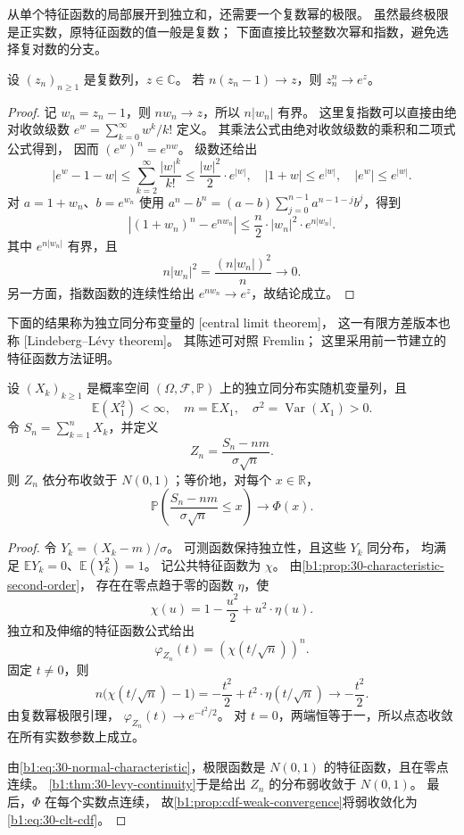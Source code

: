 从单个特征函数的局部展开到独立和，还需要一个复数幂的极限。
虽然最终极限是正实数，原特征函数的值一般是复数；
下面直接比较整数次幂和指数，避免选择复对数的分支。

\begin{lemma}\label{b1:lem:30-complex-power-limit}
设 \((z_n)_{n\geq1}\) 是复数列，\(z\in\mathbb C\)。
若 \(n(z_n-1)\to z\)，则 \(z_n^n\to e^z\)。
\end{lemma}
\begin{proof}
记 \(w_n=z_n-1\)，则 \(n w_n\to z\)，所以 \(n|w_n|\) 有界。
这里复指数可以直接由绝对收敛级数
\(e^w=\sum_{k=0}^\infty w^k/k!\) 定义。
其乘法公式由绝对收敛级数的乘积和二项式公式得到，
因而 \((e^w)^n=e^{nw}\)。
级数还给出
\[
 |e^w-1-w|
 \leq\sum_{k=2}^\infty\frac{|w|^k}{k!}
 \leq\frac{|w|^2}{2}\cdot e^{|w|},
 \quad
 |1+w|\leq e^{|w|},\quad |e^w|\leq e^{|w|}.
\]
对 \(a=1+w_n\)、\(b=e^{w_n}\) 使用
\(a^n-b^n=(a-b)\sum_{j=0}^{n-1}a^{n-1-j}b^j\)，得到
\[
 |(1+w_n)^n-e^{n w_n}|
 \leq\frac n2\cdot|w_n|^2\cdot e^{n|w_n|}.
\]
其中 \(e^{n|w_n|}\) 有界，且
\[
 n|w_n|^2=\frac{(n|w_n|)^2}{n}\longrightarrow0.
\]
另一方面，指数函数的连续性给出 \(e^{n w_n}\to e^z\)，故结论成立。
\end{proof}

下面的结果称为独立同分布变量的
[central limit theorem]，
这一有限方差版本也称
[Lindeberg--Lévy theorem]。
其陈述可对照 Fremlin\cite[274I]{Fremlin2016Measure}；
这里采用前一节建立的特征函数方法证明。

\begin{theorem}\label{b1:thm:30-iid-clt}
设 \((X_k)_{k\geq1}\) 是概率空间
\((\Omega,\mathcal F,\mathbb P)\) 上的独立同分布实随机变量列，且
\[
 \mathbb E(X_1^2)<\infty,\quad
 m=\mathbb EX_1,\quad
 \sigma^2=\operatorname{Var}(X_1)>0.
\]
令 \(S_n=\sum_{k=1}^nX_k\)，并定义
\[
 Z_n=\frac{S_n-nm}{\sigma\sqrt n}.
\]
则 \(Z_n\) 依分布收敛于 \(N(0,1)\)；等价地，对每个 \(x\in\mathbb R\)，
\begin{equation}\label{b1:eq:30-clt-cdf}
 \mathbb P\left(\frac{S_n-nm}{\sigma\sqrt n}\leq x\right)
 \longrightarrow\Phi(x).
\end{equation}
\end{theorem}
\begin{proof}
令 \(Y_k=(X_k-m)/\sigma\)。
可测函数保持独立性，且这些 \(Y_k\) 同分布，
均满足 \(\mathbb EY_k=0\)、\(\mathbb E(Y_k^2)=1\)。
记公共特征函数为 \(\chi\)。
由\cref{b1:prop:30-characteristic-second-order}，
存在在零点趋于零的函数 \(\eta\)，使
\[
 \chi(u)=1-\frac{u^2}{2}+u^2\cdot\eta(u).
\]
独立和及伸缩的特征函数公式给出
\[
 \varphi_{Z_n}(t)=\left(\chi(t/\sqrt n)\right)^n.
\]
固定 \(t\ne0\)，则
\[
 n\bigl(\chi(t/\sqrt n)-1\bigr)
 =-\frac{t^2}{2}+t^2\cdot\eta(t/\sqrt n)
 \longrightarrow-\frac{t^2}{2}.
\]
由复数幂极限引理，
\(\varphi_{Z_n}(t)\to e^{-t^2/2}\)。
对 \(t=0\)，两端恒等于一，所以点态收敛在所有实数参数上成立。

由\eqref{b1:eq:30-normal-characteristic}，极限函数是
\(N(0,1)\) 的特征函数，且在零点连续。
\cref{b1:thm:30-levy-continuity}于是给出 \(Z_n\) 的分布弱收敛于
\(N(0,1)\)。
最后，\(\Phi\) 在每个实数点连续，
故\cref{b1:prop:cdf-weak-convergence}将弱收敛化为
\eqref{b1:eq:30-clt-cdf}。
\end{proof}

